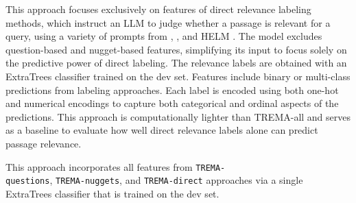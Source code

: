 This approach focuses exclusively on features of direct relevance
labeling methods, which instruct an LLM to judge whether a passage is relevant for a query, using a variety of prompts from \citet{Sun2023IsCG}, \citet{faggioli2023perspectives}, and HELM \cite{liang2022holistic}. The model excludes question-based and nugget-based features, simplifying its input to focus solely on the predictive power of direct labeling. The relevance labels are obtained with an ExtraTrees classifier trained on the dev set. Features include binary or multi-class predictions from labeling approaches. Each label is encoded using both one-hot and numerical encodings to capture both categorical and ordinal aspects of the predictions. This approach is computationally lighter than TREMA-all and serves as a baseline to evaluate how well direct relevance labels alone can predict passage relevance.

This approach incorporates all features from \texttt{TREMA-\\questions}, \texttt{TREMA-nuggets}, and \texttt{TREMA-direct} approaches via a single ExtraTrees classifier that is trained on the dev set.